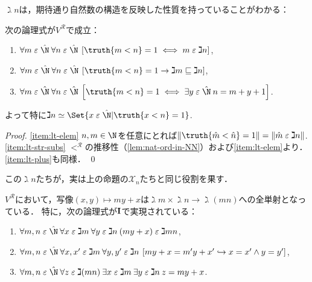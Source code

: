 \documentclass[realisability.tex]{subfiles}
\begin{document}
$\gimel n$は，期待通り自然数の構造を反映した性質を持っていることがわかる：
\begin{lemma}\label{lem:gimel-n-props}
 次の論理式が$V^{\mathcal{R}}$で成立：
 \begin{enumerate}
  \item \label{item:lt-elem}$\forall m \strin \hat{\N}\: \forall n \strin \hat{\N}\: \left[ \truth{m < n} = 1 \iff m \strin \gimel n\right]$,
  \item \label{item:lt-str-subs}$\forall m \strin \hat{\N}\: \forall n \strin \hat{\N}\: \left[ \truth{m < n} = 1 \to \gimel m \sqsubseteq \gimel n\right]$,
  \item \label{item:lt-plus}$\forall m \strin \hat{\N}\: \forall n \strin \hat{\N}\: \left[ \truth{m < n} = 1 \iff \exists y \strin \hat{\N}\: n = m + y + 1\right]$.
 \end{enumerate}
 よって特に$\gimel n \simeq \Set{x \strin \hat{\N} | \truth{x < n} = 1}$.
\end{lemma}
\begin{proof}
 \ref{item:lt-elem} $n, m \in \N$を任意にとれば$\|\truth{\hat{m} < \hat{n}} = 1\| = \|\hat{m} \strin \gimel n\|$.
 \ref{item:lt-str-subs} $<^{\mathcal{R}}$の推移性（\cref{lem:nat-ord-in-NN}）および\ref{item:lt-elem}より．
 \ref{item:lt-plus}も同様． \qed
\end{proof}
この$\gimel n$たちが，実は上の命題の$\mathcal{X}_n$たちと同じ役割を果す．
\begin{lemma}\label{lem:natural-bij-prod}
 $V^{\mathcal{R}}$において，写像$(x, y) \mapsto my + x$は$\gimel m \times \gimel n \to \gimel(mn)$への全単射となっている．
 特に，次の論理式が$\mathsf{\mathbf{I}}$で実現されている：
 \begin{enumerate}
  \item $\forall m, n \strin \hat{\N}\: \forall x \strin \gimel m\: \forall y \strin \gimel n\: (my + x) \strin \gimel mn$,
  \item $\forall m, n \strin \hat{\N}\:
         \forall x, x' \strin \gimel m \: \forall y, y' \strin \gimel n\:
         \left[ my + x = m'y + x' \hookrightarrow x = x'\land y = y' \right]$,
  \item $\forall m,n \strin \hat{\N}\:\forall z \strin \gimel(mn) \:
         \exists x \strin \gimel m \: \exists y \strin \gimel n\:
         z = my + x$.
 \end{enumerate}
\end{lemma}
\end{document}
